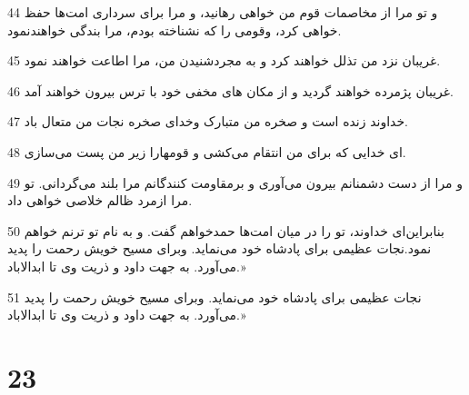 \par 44 و تو مرا از مخاصمات قوم من خواهی رهانید، و مرا برای سرداری امت‌ها حفظ خواهی کرد، وقومی را که نشناخته بودم، مرا بندگی خواهندنمود.
\par 45 غریبان نزد من تذلل خواهند کرد و به مجردشنیدن من، مرا اطاعت خواهند نمود.
\par 46 غریبان پژمرده خواهند گردید و از مکان های مخفی خود با ترس بیرون خواهند آمد.
\par 47 خداوند زنده است و صخره من متبارک وخدای صخره نجات من متعال باد.
\par 48 ‌ای خدایی که برای من انتقام می‌کشی و قومهارا زیر من پست می‌سازی.
\par 49 و مرا از دست دشمنانم بیرون می‌آوری و برمقاومت کنندگانم مرا بلند می‌گردانی. تو مرا ازمرد ظالم خلاصی خواهی داد.
\par 50 بنابراین‌ای خداوند، تو را در میان امت‌ها حمدخواهم گفت. و به نام تو ترنم خواهم نمود.نجات عظیمی برای پادشاه خود می‌نماید. وبرای مسیح خویش رحمت را پدید می‌آورد. به جهت داود و ذریت وی تا ابدالاباد.»
\par 51 نجات عظیمی برای پادشاه خود می‌نماید. وبرای مسیح خویش رحمت را پدید می‌آورد. به جهت داود و ذریت وی تا ابدالاباد.»
 
\chapter{23}

